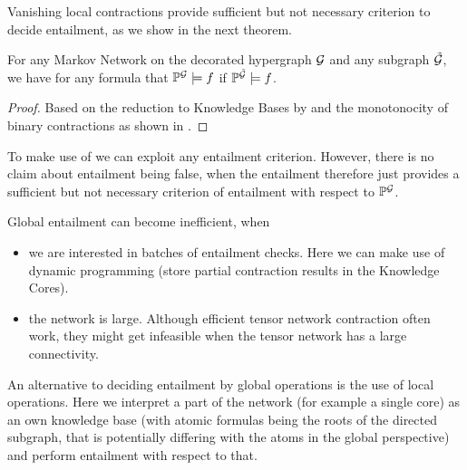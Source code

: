 

Vanishing local contractions provide sufficient but not necessary criterion to decide entailment, as we show in the next theorem.

\begin{theorem}\label{the:monotonEntailment}
	For any Markov Network on the decorated hypergraph $\mathcal{G}$ and any subgraph $\tilde{\mathcal{G}}$, we have for any formula that $\mathbb{P}^{\mathcal{G}}\models f$ if $\mathbb{P}^{\tilde{\mathcal{G}}}\models f$.
\end{theorem}	
\begin{proof}
	Based on the reduction to Knowledge Bases by  and the monotonocity of binary contractions as shown in .
\end{proof}



\begin{remark}
	To make use of  we can exploit any entailment criterion.
	However, there is no claim about entailment being false, when the entailment 
	 therefore just provides a sufficient but not necessary criterion of entailment with respect to $\mathbb{P}^{\mathcal{G}}$.
\end{remark}



\label{subsec:LocalEntailment}


Global entailment can become inefficient, when
\begin{itemize}
	\item we are interested in batches of entailment checks. Here we can make use of dynamic programming (store partial contraction results in the Knowledge Cores).
	\item the network is large. Although efficient tensor network contraction often work, they might get infeasible when the tensor network has a large connectivity.
\end{itemize}
An alternative to deciding entailment by global operations is the use of local operations.
Here we interpret a part of the network (for example a single core) as an own knowledge base (with atomic formulas being the roots of the directed subgraph, that is potentially differing with the atoms in the global perspective) and perform entailment with respect to that.

